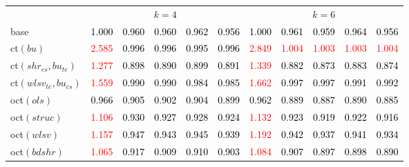 \begin{tabular}[t]{l|>{}cccc>{}c|ccccc}
\addlinespace[0.3em]
\multicolumn{1}{c}{} & \multicolumn{5}{c}{\textbf{$k = 4$}} & \multicolumn{5}{c}{\textbf{$k = 6$}}\\
base & \textcolor{black}{1.000} & \textcolor{black}{0.960} & \textcolor{black}{0.960} & \textcolor{black}{0.962} & \textcolor{black}{0.956} & \textcolor{black}{1.000} & \textcolor{black}{0.961} & \textcolor{black}{0.959} & \textcolor{black}{0.964} & \textcolor{black}{0.956}\\
ct$(bu)$ & \textcolor{red}{2.585} & \textcolor{black}{0.996} & \textcolor{black}{0.996} & \textcolor{black}{0.995} & \textcolor{black}{0.996} & \textcolor{red}{2.849} & \textcolor{red}{1.004} & \textcolor{red}{1.003} & \textcolor{red}{1.003} & \textcolor{red}{1.004}\\
ct$(shr_{cs}, bu_{te})$ & \textcolor{red}{1.277} & \textcolor{black}{0.898} & \textcolor{black}{0.890} & \textcolor{black}{0.899} & \textcolor{black}{0.891} & \textcolor{red}{1.339} & \textcolor{black}{0.882} & \textcolor{black}{0.873} & \textcolor{black}{0.883} & \textcolor{black}{0.874}\\
ct$(wlsv_{te}, bu_{cs})$ & \textcolor{red}{1.559} & \textcolor{black}{0.990} & \textcolor{black}{0.990} & \textcolor{black}{0.984} & \textcolor{black}{0.985} & \textcolor{red}{1.662} & \textcolor{black}{0.997} & \textcolor{black}{0.997} & \textcolor{black}{0.991} & \textcolor{black}{0.992}\\
oct$(ols)$ & \textcolor{black}{0.966} & \textcolor{black}{0.905} & \textcolor{black}{0.902} & \textcolor{black}{0.904} & \textcolor{black}{0.899} & \textcolor{black}{0.962} & \textcolor{black}{0.889} & \textcolor{black}{0.887} & \textcolor{black}{0.890} & \textcolor{black}{0.885}\\
oct$(struc)$ & \textcolor{red}{1.106} & \textcolor{black}{0.930} & \textcolor{black}{0.927} & \textcolor{black}{0.928} & \textcolor{black}{0.924} & \textcolor{red}{1.132} & \textcolor{black}{0.923} & \textcolor{black}{0.919} & \textcolor{black}{0.922} & \textcolor{black}{0.916}\\
oct$(wlsv)$ & \textcolor{red}{1.157} & \textcolor{black}{0.947} & \textcolor{black}{0.943} & \textcolor{black}{0.945} & \textcolor{black}{0.939} & \textcolor{red}{1.192} & \textcolor{black}{0.942} & \textcolor{black}{0.937} & \textcolor{black}{0.941} & \textcolor{black}{0.934}\\
oct$(bdshr)$ & \textcolor{red}{1.065} & \textcolor{black}{0.917} & \textcolor{black}{0.909} & \textcolor{black}{0.910} & \textcolor{black}{0.903} & \textcolor{red}{1.084} & \textcolor{black}{0.907} & \textcolor{black}{0.897} & \textcolor{black}{0.898} & \textcolor{black}{0.890}\\

\end{tabular}
